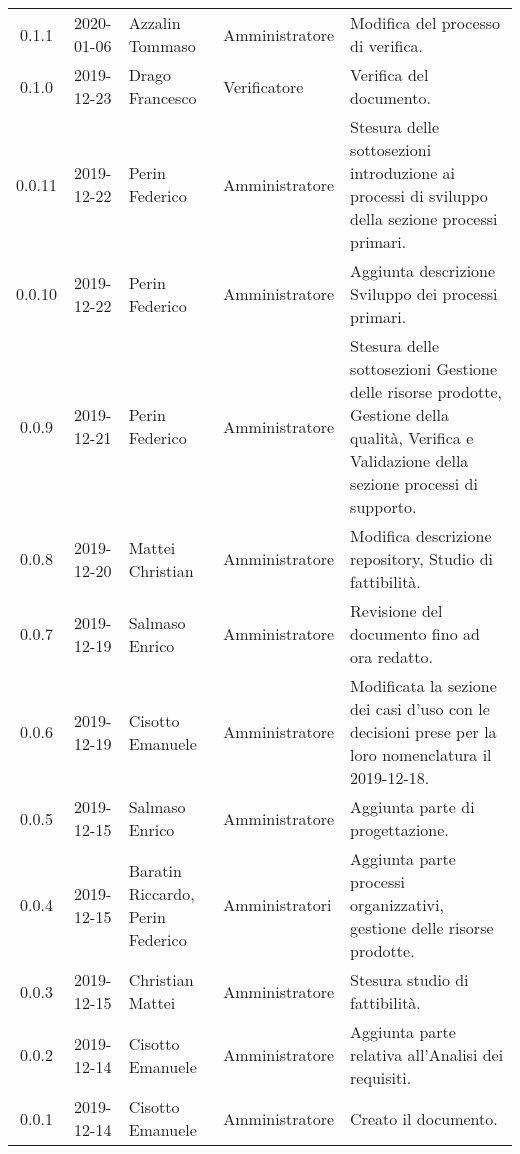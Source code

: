 {\begin{longtable}{c c  C{4cm}  C{3cm} C{4cm}}
0.1.1 & 2020-01-06 & Azzalin Tommaso & Amministratore & Modifica del processo di verifica. \\

0.1.0 & 2019-12-23 & Drago Francesco & Verificatore & Verifica del documento. \\

0.0.11 & 2019-12-22 & Perin Federico & Amministratore & Stesura delle sottosezioni introduzione ai processi di sviluppo della sezione processi primari. \\

0.0.10 & 2019-12-22 & Perin Federico  & Amministratore & Aggiunta descrizione Sviluppo dei processi primari. \\

0.0.9 & 2019-12-21 & Perin Federico & Amministratore & Stesura delle sottosezioni Gestione delle risorse prodotte, Gestione della qualità, Verifica e Validazione della sezione processi di supporto. \\

0.0.8 & 2019-12-20 & Mattei Christian & Amministratore & Modifica descrizione repository, Studio di fattibilità. \\

0.0.7 & 2019-12-19 & Salmaso Enrico & Amministratore & Revisione del documento fino ad ora redatto. \\

0.0.6 & 2019-12-19 & Cisotto Emanuele & Amministratore & Modificata la sezione dei casi d’uso con le decisioni prese per la loro nomenclatura il 2019-12-18. \\

0.0.5 & 2019-12-15 & Salmaso Enrico & Amministratore & Aggiunta parte di progettazione. \\

0.0.4 & 2019-12-15 & Baratin Riccardo, Perin Federico  & Amministratori & Aggiunta parte processi organizzativi, gestione delle risorse prodotte. \\

0.0.3 & 2019-12-15 & Christian Mattei & Amministratore & Stesura studio di fattibilità. \\

0.0.2 & 2019-12-14 & Cisotto Emanuele & Amministratore & Aggiunta parte relativa all’Analisi dei requisiti. \\

0.0.1 & 2019-12-14 & Cisotto Emanuele & Amministratore & Creato il documento. \\
		
\end{longtable}
}